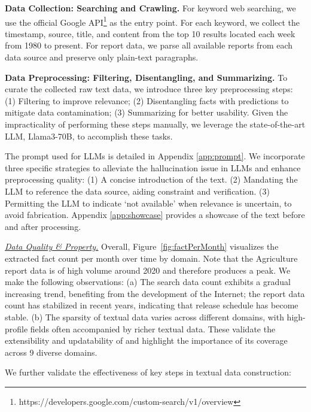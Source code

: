 \par \noindent \textbf{Data Collection: Searching and Crawling.} For keyword web searching, we use the official Google API\footnote{https://developers.google.com/custom-search/v1/overview} as the entry point. For each keyword, we collect the timestamp, source, title, and content from the top 10 results located each week from 1980 to present. For report data, we parse all available reports from each data source and preserve only plain-text paragraphs.

\par \noindent \textbf{Data Preprocessing: Filtering, Disentangling, and Summarizing.}
To curate the collected raw text data, we introduce three key preprocessing steps: (1) Filtering to improve relevance; (2) Disentangling facts with predictions to mitigate data contamination; (3) Summarizing for better usability. Given the impracticality of performing these steps manually, we leverage the state-of-the-art LLM, Llama3-70B, to accomplish these tasks.

The prompt used for LLMs is detailed in Appendix \ref{app:prompt}. We incorporate three specific strategies to alleviate the hallucination issue in LLMs and enhance preprocessing quality: (1) A concise introduction of the text. (2) Mandating the LLM to reference the data source, aiding constraint and verification. (3) Permitting the LLM to indicate `not available' when relevance is uncertain, to avoid fabrication. Appendix \ref{app:showcase} provides a showcase of the text before and after processing.

\par \noindent \textit{\underline{Data Quality \& Property.}} Overall, Figure~\ref{fig:factPerMonth} visualizes the extracted fact count per month over time by domain. Note that the Agriculture report data is of high volume around 2020 and therefore produces a peak. We make the following observations: (a) The search data count exhibits a gradual increasing trend, benefiting from the development of the Internet; the report data count has stabilized in recent years, indicating that release schedule has become stable. (b) The sparsity of textual data varies across different domains, with high-profile fields often accompanied by richer textual data. These validate the extensibility and updatability of \model and highlight the importance of its coverage across 9 diverse domains. 

We further validate the effectiveness of key steps in textual data construction:

